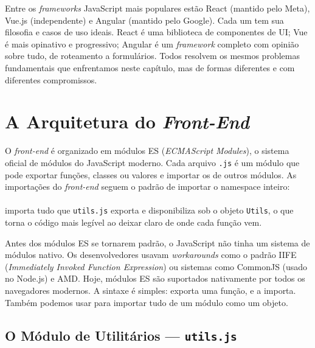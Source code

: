\begin{saibaMais}
    Entre os \textit{frameworks} JavaScript mais populares estão React (mantido pelo Meta), Vue.js (independente) e Angular (mantido pelo Google). Cada um tem sua filosofia e casos de uso ideais. React é uma biblioteca de componentes de UI; Vue é mais opinativo e progressivo; Angular é um \textit{framework} completo com opinião sobre tudo, de roteamento a formulários. Todos resolvem os mesmos problemas fundamentais que enfrentamos neste capítulo, mas de formas diferentes e com diferentes compromissos.
\end{saibaMais}


\section{A Arquitetura do \textit{Front-End}}

O \textit{front-end} é organizado em módulos ES (\textit{ECMAScript Modules}), o sistema oficial de módulos do JavaScript moderno. Cada arquivo \texttt{.js} é um módulo que pode exportar funções, classes ou valores e importar os de outros módulos. As importações do \textit{front-end} seguem o padrão de importar o namespace inteiro:\\\\importa tudo que \texttt{utils.js} exporta e disponibiliza sob o objeto \texttt{Utils}, o que torna o código mais legível ao deixar claro de onde cada função vem.

\begin{saibaMais}
    Antes dos módulos ES se tornarem padrão, o JavaScript não tinha um sistema de módulos nativo. Os desenvolvedores usavam \textit{workarounds} como o padrão IIFE (\textit{Immediately Invoked Function Expression}) ou sistemas como CommonJS (usado no Node.js) e AMD. Hoje, módulos ES são suportados nativamente por todos os navegadores modernos. A sintaxe é simples:  exporta uma função, e  a importa. Também podemos usar  para importar tudo de um módulo como um objeto.
\end{saibaMais}


\subsection{O Módulo de Utilitários --- \texttt{utils.js}}

